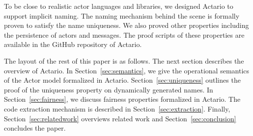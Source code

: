 To be close to realistic actor languages and libraries, we designed
Actario to support implicit naming. The naming mechanism behind the
scene is formally proven to satisfy the name uniqueness.  We also
proved other properties including the persistence of actors and
messages.  The proof scripts of these properties are available in the
GitHub repository of Actario\cite{Actario}.






The layout of the rest of this paper is as follows.
The next section describes the overview of Actario.
In Section~\ref{sec:semantics}, we give the operational semantics of the Actor model formalized in Actario.
Section~\ref{sec:uniqueness} outlines the proof of the uniqueness property on dynamically generated names.
In Section~\ref{sec:fairness}, we discuss fairness properties formalized in Actario.
The code extraction mechanism is described in Section~\ref{sec:extraction}.
Finally, Section~\ref{sec:relatedwork} overviews related work and Section~\ref{sec:conclusion} concludes the paper.

